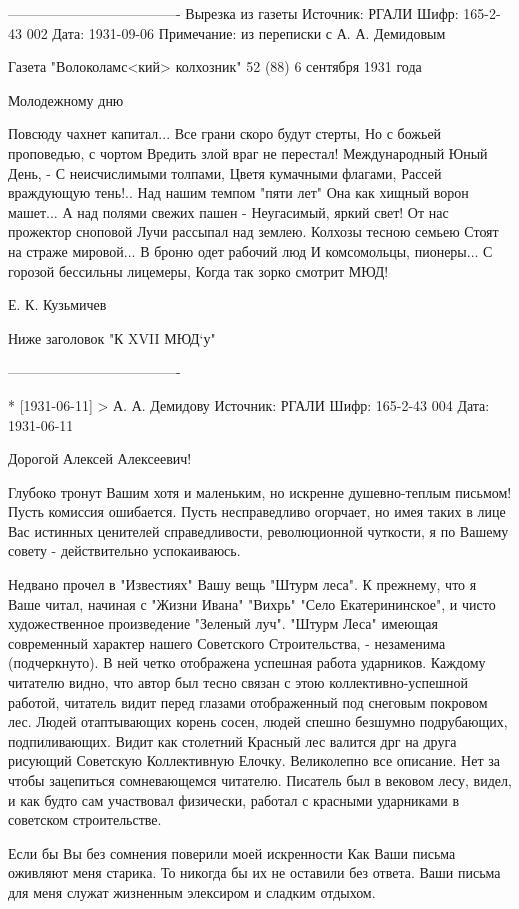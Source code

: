 -------------------------------------
Вырезка из газеты
Источник: РГАЛИ
Шифр: 165-2-43 002
Дата: 1931-09-06
Примечание: из переписки с А. А. Демидовым

Газета "Волоколамс<кий> колхозник" 52 (88) 6 сентября 1931 года

Молодежному дню

Повсюду чахнет капитал...
Все грани скоро будут стерты,
Но с божьей проповедью, с чортом
Вредить злой враг не перестал!
Международный Юный День, -
С неисчислимыми толпами,
Цветя кумачными флагами,
Рассей враждующую тень!..
Над нашим темпом "пяти лет"
Она как хищный ворон машет...
А над полями свежих пашен - 
Неугасимый, яркий свет!
От нас прожектор сноповой
Лучи рассыпал над землею.
Колхозы тесною семьею
Стоят на страже мировой...
В броню одет рабочий люд
И комсомольцы, пионеры...
С горозой бессильны лицемеры,
Когда так зорко смотрит МЮД!

Е. К. Кузьмичев

Ниже заголовок
"К XVII МЮД`у"


-------------------------------------


* [1931-06-11] > А. А. Демидову 
Источник: РГАЛИ
Шифр: 165-2-43 004
Дата: 1931-06-11

Дорогой Алексей Алексеевич!

Глубоко тронут Вашим хотя и маленьким, но искренне душевно-теплым письмом! Пусть комиссия ошибается. Пусть несправедливо огорчает, но имея таких в лице Вас истинных ценителей справедливости, революционной чуткости, я по Вашему совету - действительно успокаиваюсь.

Недвано прочел в "Известиях" Вашу вещь "Штурм леса". К прежнему, что я Ваше читал, начиная с "Жизни Ивана" "Вихрь" "Село Екатерининское", и чисто художественное произведение "Зеленый луч". "Штурм Леса" имеющая современный характер нашего Советского Строительства, - незаменима (подчеркнуто). В ней четко отображена успешная работа ударников. Каждому читателю видно, что автор был тесно связан с этою коллективно-успешной работой, читатель видит перед глазами отображенный под снеговым покровом лес. Людей отаптывающих корень сосен, людей спешно безшумно подрубающих, подпиливающих. Видит как столетний Красный лес валится дрг на друга рисующий Советскую Коллективную Елочку. Великолепно все описание. Нет за чтобы зацепиться сомневающемся читателю. Писатель был в вековом лесу, видел, и как будто сам участвовал физически, работал с красными ударниками в советском строительстве.

Если бы Вы без сомнения поверили моей искренности Как Ваши письма оживляют меня старика. То никогда бы их не оставили без ответа. Ваши письма для меня служат жизненным элексиром и сладким отдыхом. 

